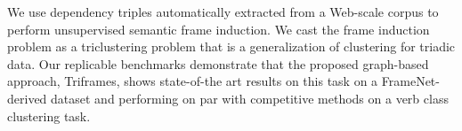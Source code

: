 We use dependency triples automatically extracted from a Web-scale corpus to perform unsupervised semantic frame induction. We cast the frame induction problem as a triclustering problem that is a generalization of clustering for triadic data. Our replicable benchmarks demonstrate that the proposed graph-based approach, Triframes, shows state-of-the art results on this task on a FrameNet-derived dataset and performing on par with competitive methods on a verb class clustering task.
